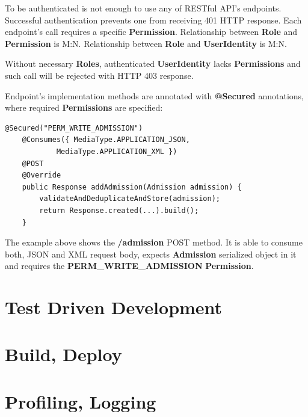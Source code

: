 	To be authenticated is not enough to use any of RESTful API's endpoints. Successful authentication prevents one from
	receiving 401 HTTP response. Each endpoint's call requires a specific \textbf{Permission}. Relationship between
	\textbf{Role} and \textbf{Permission} is M:N. Relationship between \textbf{Role} and \textbf{UserIdentity} is M:N.
	
	Without necessary \textbf{Roles}, authenticated \textbf{UserIdentity} lacks \textbf{Permissions} and such call
	will be rejected with HTTP 403 response.
	
	Endpoint's implementation methods are annotated with \textbf{@Secured} annotations, where required \textbf{Permissions}
	are specified:
	
	\lstset{language=Java}
	\begin{lstlisting}[tabsize=2]
	@Secured("PERM_WRITE_ADMISSION")
	@Consumes({ MediaType.APPLICATION_JSON,
			MediaType.APPLICATION_XML })
	@POST
	@Override
	public Response addAdmission(Admission admission) {
		validateAndDeduplicateAndStore(admission);
		return Response.created(...).build();
	}
	\end{lstlisting}
	
	The example above shows the \textbf{/admission} POST method. It is able to consume both, JSON and XML request body,
	expects \textbf{Admission} serialized object in it and requires the \textbf{PERM\_WRITE\_ADMISSION}
	\textbf{Permission}.
	
	\section{Test Driven Development}
	
	\section{Build, Deploy}
	
	\section{Profiling, Logging}
